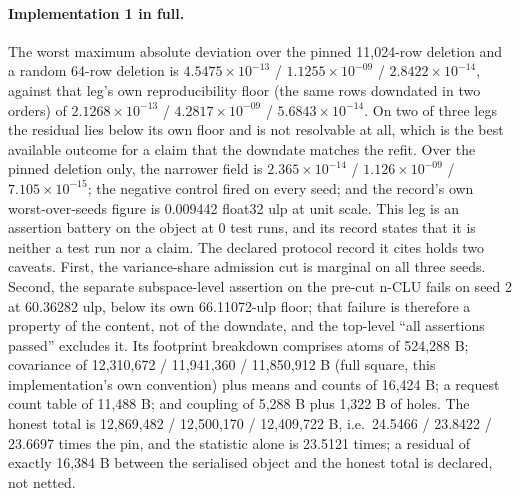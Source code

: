 \documentclass{article} %
\newcommand{\sci}[2]{\ensuremath{#1\times10^{#2}}}
\begin{document}
\paragraph{Implementation 1 in full.} The worst maximum absolute deviation over the pinned
11,024-row deletion and a random 64-row deletion is \sci{4.5475}{-13} / \sci{1.1255}{-09} /
\sci{2.8422}{-14}, against that leg's own reproducibility floor (the same rows downdated in two
orders) of \sci{2.1268}{-13} / \sci{4.2817}{-09} / \sci{5.6843}{-14}. On two of three legs the
residual lies below its own floor and is not resolvable at all, which is the best available outcome for a claim that the downdate matches the refit. Over the pinned deletion only, the narrower field is \sci{2.365}{-14} /
\sci{1.126}{-09} / \sci{7.105}{-15}; the negative control fired on every seed; and the record's
own worst-over-seeds figure is 0.009442 float32 ulp at unit scale. %
This leg is an assertion battery on the object at 0 test runs, and its record states that it is
neither a test run nor a claim. The declared protocol record it cites holds two caveats. First, the variance-share
admission cut is marginal on all three seeds. Second, the separate subspace-level assertion on the
pre-cut n-CLU fails on seed 2 at 60.36282 ulp, below its own 66.11072-ulp floor; that failure is
therefore a property of the content, not of the downdate, and the top-level ``all assertions
passed'' excludes it. %
Its footprint breakdown comprises atoms of 524,288 B; covariance of 12,310,672 / 11,941,360 /
11,850,912 B (full square, this implementation's own convention) plus means and counts of 16,424
B; a request count table of 11,488 B; and coupling of 5,288 B plus 1,322 B of holes. The honest
total is 12,869,482 / 12,500,170 / 12,409,722 B, i.e.\ 24.5466 / 23.8422 / 23.6697 times the pin,
and the statistic alone is 23.5121 times; a residual of exactly 16,384 B between the serialised %
object and the honest total is declared, not netted. %
\end{document}
